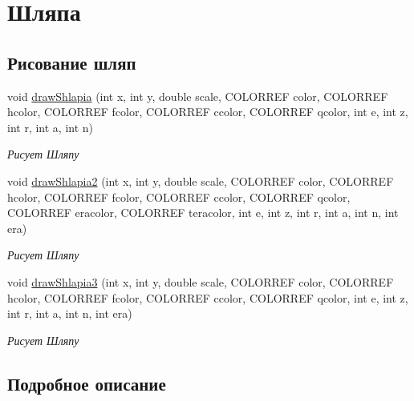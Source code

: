 \hypertarget{group___xD0_xA8_xD0_xBB_xD1_x8F_xD0_xBF_xD0_xB0}{}\section{Шляпа}
\label{group___xD0_xA8_xD0_xBB_xD1_x8F_xD0_xBF_xD0_xB0}
\subsection*{Рисование шляп}
\begin{DoxyCompactItemize}
\item 
void \hyperlink{group___xD0_xA8_xD0_xBB_xD1_x8F_xD0_xBF_xD0_xB0_ga9df39a4ca466b91c0b469cbece358423}{draw\+Shlapia} (int x, int y, double scale, C\+O\+L\+O\+R\+R\+EF color, C\+O\+L\+O\+R\+R\+EF hcolor, C\+O\+L\+O\+R\+R\+EF fcolor, C\+O\+L\+O\+R\+R\+EF ccolor, C\+O\+L\+O\+R\+R\+EF qcolor, int e, int z, int r, int a, int n)
\begin{DoxyCompactList}\small\item\em Рисует Шляпу \end{DoxyCompactList}\item 
void \hyperlink{group___xD0_xA8_xD0_xBB_xD1_x8F_xD0_xBF_xD0_xB0_ga06dbb8364e388527ea7e24dde5900725}{draw\+Shlapia2} (int x, int y, double scale, C\+O\+L\+O\+R\+R\+EF color, C\+O\+L\+O\+R\+R\+EF hcolor, C\+O\+L\+O\+R\+R\+EF fcolor, C\+O\+L\+O\+R\+R\+EF ccolor, C\+O\+L\+O\+R\+R\+EF qcolor, C\+O\+L\+O\+R\+R\+EF eracolor, C\+O\+L\+O\+R\+R\+EF teracolor, int e, int z, int r, int a, int n, int era)
\begin{DoxyCompactList}\small\item\em Рисует Шляпу \end{DoxyCompactList}\item 
void \hyperlink{group___xD0_xA8_xD0_xBB_xD1_x8F_xD0_xBF_xD0_xB0_ga19f574161defa3d320e3746940f4f99e}{draw\+Shlapia3} (int x, int y, double scale, C\+O\+L\+O\+R\+R\+EF color, C\+O\+L\+O\+R\+R\+EF hcolor, C\+O\+L\+O\+R\+R\+EF fcolor, C\+O\+L\+O\+R\+R\+EF ccolor, C\+O\+L\+O\+R\+R\+EF qcolor, int e, int z, int r, int a, int n, int era)
\begin{DoxyCompactList}\small\item\em Рисует Шляпу \end{DoxyCompactList}\end{DoxyCompactItemize}


\subsection{Подробное описание}


